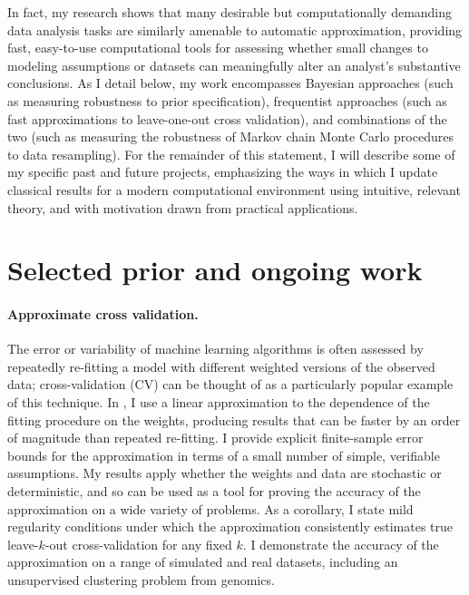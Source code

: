 In fact, my research shows that many desirable but computationally demanding
data analysis tasks are similarly amenable to automatic approximation, providing
fast, easy-to-use computational tools for assessing whether small changes to
modeling assumptions or datasets can meaningfully alter an analyst's substantive
conclusions.  As I detail below, my work encompasses Bayesian approaches (such
as measuring robustness to prior specification), frequentist approaches (such as
fast approximations to leave-one-out cross validation), and combinations of the
two (such as measuring the robustness of Markov chain Monte Carlo procedures to
data resampling). For the remainder of this statement, I will describe some of
my specific past and future projects, emphasizing the ways in which I update
classical results for a modern computational environment using intuitive,
relevant theory, and with motivation drawn from practical applications.

\section{Selected prior and ongoing work}


\paragraph{Approximate cross validation.}
%
The error or variability of machine learning algorithms is often assessed by
repeatedly re-fitting a model with different weighted versions of the observed
data; cross-validation (CV) can be thought of as a particularly popular example
of this technique.
%
In \citet{giordano:2019:ij}, I use a linear approximation to the dependence of
the fitting procedure on the weights, producing results that can be faster by an
order of magnitude than repeated re-fitting. I provide explicit finite-sample
error bounds for the approximation in terms of a small number of simple,
verifiable assumptions.  My results apply whether the weights and data are
stochastic or deterministic, and so can be used as a tool for proving the
accuracy of the approximation on a wide variety of problems. As a
corollary, I state mild regularity conditions under which the approximation
consistently estimates true leave-$k$-out cross-validation for any fixed $k$. I
demonstrate the accuracy of the approximation on a range of simulated and real
datasets, including an unsupervised clustering problem from genomics.


